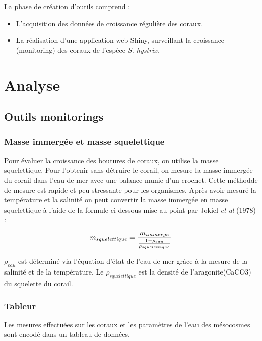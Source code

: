\documentclass[]{report}
\begin{document}
La phase de création d'outils comprend :

\begin{itemize}
\item
  L'acquisition des données de croissance régulière des coraux.
\item
  La réalisation d'une application web Shiny, surveillant la croissance
  (monitoring) des coraux de l'espèce \emph{S. hystrix}.
\end{itemize}

\chapter{Analyse}\label{analyse}

\section{Outils monitorings}\label{outils-monitorings}

\subsection{Masse immergée et masse
squelettique}\label{masse-immergee-et-masse-squelettique}

Pour évaluer la croissance des boutures de coraux, on utilise la masse
squelettique. Pour l'obtenir sans détruire le corail, on mesure la masse
immergée du corail dans l'eau de mer avec une balance munie d'un
crochet. Cette méthodde de mesure est rapide et peu stressante pour les
organismes. Après avoir mesuré la température et la salinité on peut
convertir la masse immergée en masse squelettique à l'aide de la formule
ci-dessous mise au point par Jokiel \emph{et al} (1978) :

\begin{equation}
\large
  m_{squelettique} = \frac {m_{immerge}}{ \frac{1 - \rho_{eau}}{ \rho_{squelettique}}}
\end{equation}

\(\rho_{eau}\) est déterminé via l'équation d'état de l'eau de mer grâce
à la mesure de la salinité et de la température. Le
\(\rho_{squelettique}\) est la densité de l'aragonite(CaCO3) du
squelette du corail.

\subsection{Tableur}\label{tableur}

Les mesures effectuées sur les coraux et les paramètres de l'eau des
mésocosmes sont encodé dans un tableau de données.
\end{document}
